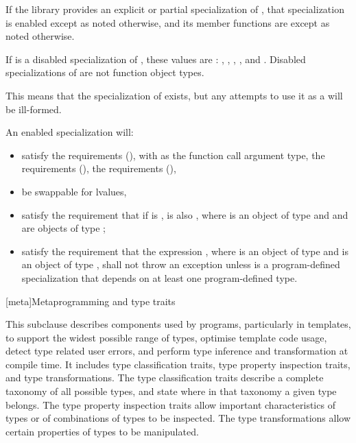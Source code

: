 \pnum
If the library provides an explicit or partial specialization of ,
that specialization is enabled except as noted otherwise,
and its member functions are  except as noted otherwise.

\pnum
If  is a disabled specialization of ,
these values are :
,
,
,
, and
.
Disabled specializations of 
are not function object types.
\begin{note}
This means that the specialization of  exists, but
any attempts to use it as a  will be ill-formed.
\end{note}

\pnum
An enabled specialization  will:
\begin{itemize}
\item satisfy the  requirements (),
with  as the function
call argument type, the  requirements (),
the  requirements (),
\item be swappable for lvalues,
\item satisfy the requirement that if  is ,  is
also , where  is an object of type  and  and 
are objects of type ;
\item satisfy the requirement that the expression , where 
is an object of type  and  is an object of type
, shall not throw an exception unless  is a
program-defined specialization that depends on at least one program-defined type.
\end{itemize}

[meta]{Metaprogramming and type traits}

\pnum
This subclause describes components used by \Cpp{} programs, particularly in
templates, to support the widest possible range of types, optimise
template code usage, detect type related user errors, and perform
type inference and transformation at compile time. It includes type
classification traits, type property inspection traits, and type
transformations. The type classification traits describe a complete taxonomy
of all possible \Cpp{} types, and state where in that taxonomy a given
type belongs. The type property inspection traits allow important
characteristics of types or of combinations of types to be inspected. The
type transformations allow certain properties of types to be manipulated.

